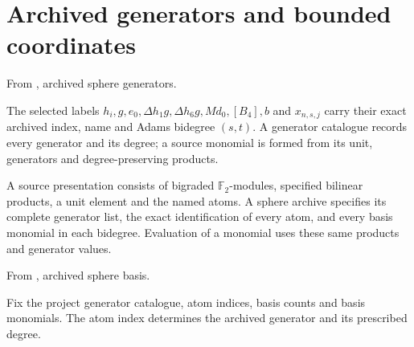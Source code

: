 

\section{Archived generators and bounded coordinates}

\begin{definition}
\label{sem:Computation:archive-labels}
From \cite{LinProgram}, archived sphere generators.\par
The selected labels $h_i,g,e_0,\Delta h_1g,\Delta h_6g,Md_0,[B_4],b$ and $x_{n,s,j}$ carry their exact archived index, name and Adams bidegree $(s,t)$. A generator catalogue records every generator and its degree; a source monomial is formed from its unit, generators and degree-preserving products.
\end{definition}

\begin{definition}
\label{sem:Computation:source-presentation}
A source presentation consists of bigraded $\mathbb F_2$-modules, specified bilinear products, a unit element and the named atoms. A sphere archive specifies its complete generator list, the exact identification of every atom, and every basis monomial in each bidegree. Evaluation of a monomial uses these same products and generator values.
\end{definition}

\begin{definition}
\label{sem:Computation:fixed-archive}
From \cite{LinProgram}, archived sphere basis.\par
Fix the project generator catalogue, atom indices, basis counts and basis monomials. The atom index determines the archived generator and its prescribed degree.
\end{definition}

